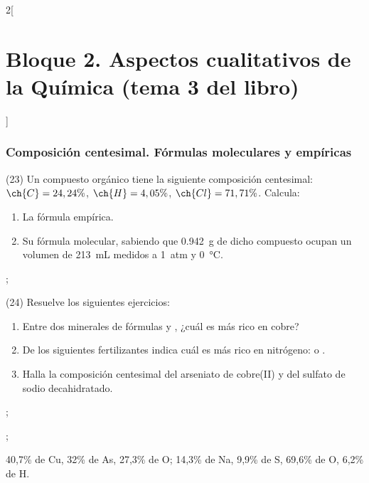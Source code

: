 \documentclass[10pt]{article}
\begin{document}
\begin{multicols}{2}[
    \section{Bloque 2. Aspectos cualitativos de la Química (tema 3 del libro)}
  ]
\subsubsection{Composición centesimal. Fórmulas moleculares y empíricas}

\begin{exercise}[
    tags    = {},
    topics  = {química,química básica},
    source  = {FQ 1B MGH 2016, p84, e23},
  ]
  (23) Un compuesto orgánico tiene la siguiente composición centesimal: \( \ch{C} = 24,24\% \), \( \ch{H} = 4,05\% \), \( \ch{Cl} = 71,71\% \). Calcula: %
  \begin{enumerate}
    \item La fórmula empírica.
    \item Su fórmula molecular, sabiendo que \SI{0.942}{\gram} de dicho compuesto ocupan un volumen de \SI{213}{\milli\liter} medidos a \SI{1}{atm} y \SI{0}{\celsius}.
  \end{enumerate}
\end{exercise}

\begin{solution}
  \begin{enumerate*}
    \item {};
    \item {}
  \end{enumerate*}
\end{solution}




\begin{exercise}[
    tags    = {},
    topics  = {química,química básica},
    source  = {FQ 1B MGH 2016, p84, e24},
  ]
  (24) Resuelve los siguientes ejercicios:
  \begin{enumerate}
    \item Entre dos minerales de fórmulas  y , ¿cuál es más rico en cobre?
    \item De los siguientes fertilizantes indica cuál es más rico en nitrógeno:  o .
    \item Halla la composición centesimal del arseniato de cobre(II)
    y del sulfato de sodio decahidratado.
  \end{enumerate}
\end{exercise}

\begin{solution}
  \begin{enumerate*}
    \item {};
    \item {};
    \item 40,7\% de Cu, 32\% de As, 27,3\% de O; 14,3\% de Na, 9,9\% de S, 69,6\% de O, 6,2\% de H.
  \end{enumerate*}
\end{solution}







\end{multicols}
\end{document}
